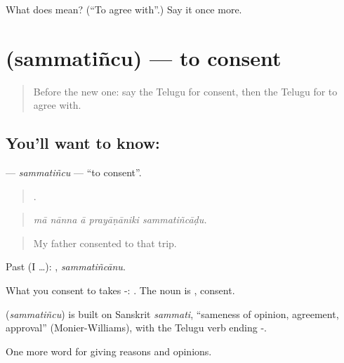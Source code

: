 \begin{tcolorbox}[breakable,colback=teal!4,colframe=teal!35!black,title={Before you move on}]
What does  mean? (\textquotedblleft{}To agree with\textquotedblright{}.) Say it once more.
\end{tcolorbox}
\section[\texorpdfstring{\te{సమ్మతించు} (sammatiñcu)}{సమ్మతించు (sammatiñcu)}]{ (sammatiñcu) — to consent}

\label{lesson:TE-C385-sammatincu}



\begin{quote}
Before the new one: say the Telugu for consent, then the Telugu for to agree with.
\end{quote}

\subsection*{You'll want to know: }
\textbf{} — \emph{sammatiñcu} — \textquotedblleft{}to consent\textquotedblright{}.

\begin{quote}
    .
\end{quote}

\begin{quote}
\emph{mā nānna ā prayāṇāniki sammatiñcāḍu.}
\end{quote}

\begin{quote}
My father consented to that trip.
\end{quote}

Past (I …): , \emph{sammatiñcānu}.

What you consent to takes -:  . The noun is , consent.

\begin{cousinweb}
\textbf{} (\emph{sammatiñcu}) is built on Sanskrit \emph{sammati}, \textquotedblleft{}sameness of opinion, agreement, approval\textquotedblright{} (Monier-Williams), with the Telugu verb ending -.
\end{cousinweb}

\begin{grammarlens}[title={What you've built}]
One more word for giving reasons and opinions.
\end{grammarlens}


